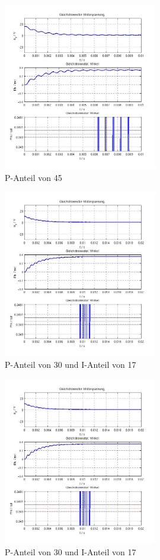 \begin{figure}[ht]
	\centering
	\includegraphics[width=0.6\textwidth]{NurP45.jpg}
	\caption{P-Anteil von 45}
	\label{p45}
\end{figure}


\begin{figure}[ht]
	\centering
	\includegraphics[width=0.6\textwidth]{PI-P30I17.jpg}
	\caption{P-Anteil von 30 und I-Anteil von 17}
	\label{p30i17}
\end{figure}


\begin{figure}[ht]
	\centering
	\includegraphics[width=0.6\textwidth]{PI-P30I17.jpg}
	\caption{P-Anteil von 30 und I-Anteil von 17}
	\label{p30i17}
\end{figure}


